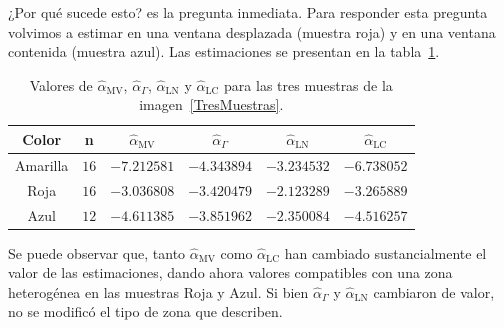 ¿Por qué sucede esto? es la pregunta inmediata. Para responder esta pregunta volvimos a estimar en una ventana desplazada (muestra roja) y en una ventana contenida (muestra azul). Las estimaciones se presentan en la tabla~\ref{TablaTresMuestras}.

\begin{table}[htb]
	\centering
	\caption{\label{TablaTresMuestras} Valores de $\widehat{\alpha}_{\text{MV}}$, $\widehat{\alpha}_{\Gamma}$, $\widehat{\alpha}_{\text{LN}}$ y $\widehat{\alpha}_{\text{LC}}$ para las tres muestras de la imagen~\ref{TresMuestras}.}
	\begin{tabular}{c*5{c}}
		\toprule
		Color       &  n    &  $\widehat{\alpha}_{\text{MV}}$    &  $\widehat{\alpha}_{\Gamma}$  &  $\widehat{\alpha}_{\text{LN}}$ &  $\widehat{\alpha}_{\text{LC}}$\\
		\midrule
		Amarilla    & $16$  & $-7.212581$ & $-4.343894$ & $-3.234532$ & $-6.738052$\\
		Roja        & $16$  & $-3.036808$ & $-3.420479$ & $-2.123289$ & $-3.265889$\\
		Azul        & $12$  & $-4.611385$ & $-3.851962$ & $-2.350084$ & $-4.516257$\\
		\bottomrule
	\end{tabular}
\end{table}

Se puede observar que, tanto $\widehat{\alpha}_{\text{MV}}$ como $\widehat{\alpha}_{\text{LC}}$ han cambiado sustancialmente el valor de las estimaciones, dando ahora valores compatibles con una zona heterogénea en las muestras Roja y Azul. Si bien $\widehat{\alpha}_{\Gamma}$ y $\widehat{\alpha}_{\text{LN}}$ cambiaron de valor, no se modificó el tipo de zona que describen. 

